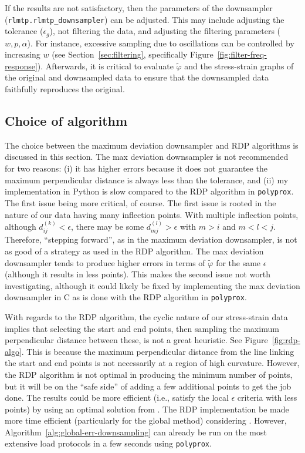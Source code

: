 \documentclass[a4paper,11pt]{article}
\begin{document}
If the results are not satisfactory, then the parameters of the downsampler (\texttt{rlmtp.rlmtp\_downsampler}) can be adjusted.
This may include adjusting the tolerance ($\epsilon_g$), not filtering the data, and adjusting the filtering parameters ($w, p, \alpha$).
For instance, excessive sampling due to oscillations can be controlled by increasing $w$ (see Section~\ref{sec:filtering}, specifically Figure~\ref{fig:filter-freq-response}).
Afterwards, it is critical to evaluate $\tilde{\varphi}$ and the stress-strain graphs of the original and downsampled data to ensure that the downsampled data faithfully reproduces the original.

\subsection{Choice of algorithm}

The choice between the maximum deviation downsampler and RDP algorithms is discussed in this section.
The max deviation downsampler is not recommended for two reasons:
(i) it has higher errors because it does not guarantee the maximum perpendicular distance is always less than the tolerance, and (ii) my implementation in Python is slow compared to the RDP algorithm in \texttt{polyprox}.
The first issue being more critical, of course.
The first issue is rooted in the nature of our data having many inflection points.
With multiple inflection points, although $d^{(k)}_{ij} < \epsilon$, there may be some $d^{(l)}_{mj} > \epsilon$ with $m > i$ and $m < l < j$.
Therefore, ``stepping forward'', as in the maximum deviation downsampler, is not as good of a strategy as used in the RDP algorithm.
The max deviation downsampler tends to produce higher errors in terms of $\tilde{\varphi}$ for the same $\epsilon$ (although it results in less points).
This makes the second issue not worth investigating, although it could likely be fixed by implementing the max deviation downsampler in C as is done with the RDP algorithm in \texttt{polyprox}.

With regards to the RDP algorithm, the cyclic nature of our stress-strain data implies that selecting the start and end points, then sampling the maximum perpendicular distance between these, is not a great heuristic.
See Figure~\ref{fig:rdp-algo}.
This is because the maximum perpendicular distance from the line linking the start and end points is not necessarily at a region of high curvature.
However, the RDP algorithm is not optimal in producing the minimum number of points, but it will be on the ``safe side'' of adding a few additional points to get the job done.
The results could be more efficient (i.e., satisfy the local $\epsilon$ criteria with less points) by using an optimal solution from \citet{ChanApproximationPolygonalCurves1996}.
The RDP implementation be made more time efficient (particularly for the global method) considering \citet{HershbergerSpeedingDouglasPeuckerLineSimpli1992}.
However, Algorithm~\ref{alg:global-err-downsampling} can already be run on the most extensive load protocols in a few seconds using \texttt{polyprox}.
\end{document}
